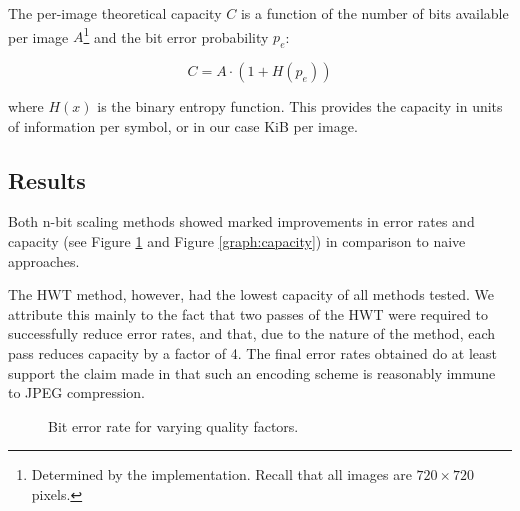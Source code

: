 The per-image theoretical capacity $C$ is a function of the number of bits available per image $A$\footnote{Determined by the implementation. Recall that all images are $720 \times 720$ pixels.} and the bit error probability $p_e$:

\begin{equation}
    C = A \cdot (1 + H(p_e))
\end{equation}

where $H(x)$ is the binary entropy function. This provides the capacity in units of information per symbol, or in our case KiB per image.

\subsection{Results}

Both n-bit scaling methods showed marked improvements in error rates and capacity (see Figure \ref{graph:ber} and Figure \ref{graph:capacity}) in comparison to naive approaches.

The HWT method, however, had the lowest capacity of all methods tested. We attribute this mainly to the fact that two passes of the HWT were required to successfully reduce error rates, and that, due to the nature of the method, each pass reduces capacity by a factor of 4. The final error rates obtained do at least support the claim made in \cite{haar} that such an encoding scheme is reasonably immune to JPEG compression.


\begin{figure}[tbph]
  \begin{center}
    \caption{Bit error rate for varying quality factors.}
    \label{graph:ber}
  \end{center}
\end{figure}

